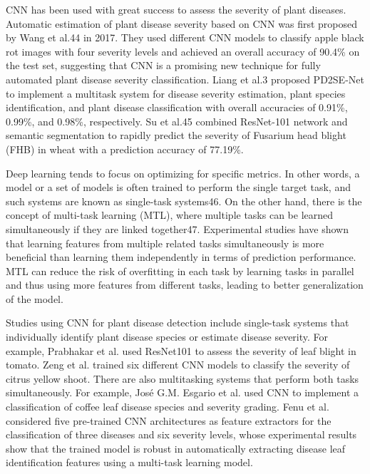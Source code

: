 CNN has been used with great success to assess the severity of plant diseases. Automatic estimation of plant disease severity based on CNN was first proposed by Wang et al.44 in 2017. They used different CNN models to classify apple black rot images with four severity levels and achieved an overall accuracy of 90.4\% on the test set, suggesting that CNN is a promising new technique for fully automated plant disease severity classification. Liang et al.3 proposed PD2SE-Net to implement a multitask system for disease severity estimation, plant species identification, and plant disease classification with overall accuracies of 0.91\%, 0.99\%, and 0.98\%, respectively. Su et al.45 combined ResNet-101 network and semantic segmentation to rapidly predict the severity of Fusarium head blight (FHB) in wheat with a prediction accuracy of 77.19\%.

Deep learning tends to focus on optimizing for specific metrics. In other words, a model or a set of models is often trained to perform the single target task, and such systems are known as single-task systems46. On the other hand, there is the concept of multi-task learning (MTL), where multiple tasks can be learned simultaneously if they are linked together47. Experimental studies have shown that learning features from multiple related tasks simultaneously is more beneficial than learning them independently in terms of prediction performance. MTL can reduce the risk of overfitting in each task by learning tasks in parallel and thus using more features from different tasks, leading to better generalization of the model.

Studies using CNN for plant disease detection include single-task systems that individually identify plant disease species or estimate disease severity. For example, Prabhakar et al. used ResNet101 to assess the severity of leaf blight in tomato. Zeng et al. trained six different CNN models to classify the severity of citrus yellow shoot. There are also multitasking systems that perform both tasks simultaneously. For example, José G.M. Esgario et al. used CNN to implement a classification of coffee leaf disease species and severity grading. Fenu et al. considered five pre-trained CNN architectures as feature extractors for the classification of three diseases and six severity levels, whose experimental results show that the trained model is robust in automatically extracting disease leaf identification features using a multi-task learning model.

